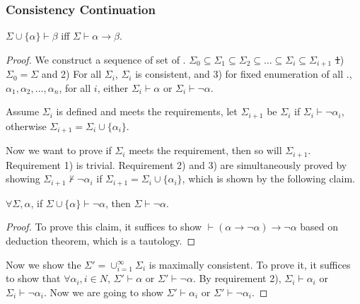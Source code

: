 \subsubsection{Consistency Continuation}

\begin{theorem}
  $\Sigma \cup \{ \alpha \} \vdash \beta$ iff $\Sigma \vdash \alpha \rightarrow \beta$.
\end{theorem}




\begin{proof}
We construct a sequence of set of \wff. $\Sigma_0 \subseteq \Sigma_1 \subseteq \Sigma_2 \subseteq \ldots \subseteq \Sigma_i \subseteq \Sigma_{i+1}$ \st 1) $\Sigma_0 = \Sigma$ and 2) For all $\Sigma_i$, $\Sigma_i$ is consistent, and 3) for fixed enumeration of all \wff., $\alpha_1, \alpha_2, \ldots, \alpha_n$, for all $i$, either $\Sigma_i \vdash \alpha$ or $\Sigma_i \vdash \neg \alpha$.

Assume $\Sigma_i$ is defined and meets the requirements, let $\Sigma_{i+1}$ be $\Sigma_i$ if $\Sigma_i \vdash \neg \alpha_{i}$, otherwise $\Sigma_{i+1} = \Sigma_i \cup \{ \alpha_i \}$. 

Now we want to prove if $\Sigma_i$ meets the requirement, then so will $\Sigma_{i+1}$.
Requirement 1) is trivial. Requirement 2) and 3) are simultaneously proved by showing $\Sigma_{i+1} \nvdash \neg \alpha_i$ if $\Sigma_{i+1} = \Sigma_i \cup \{\alpha_i\}$, which is shown by the following claim.

\begin{claim}
  $\forall \Sigma, \alpha$, if $\Sigma \cup \{ \alpha \} \vdash \neg \alpha$, then $\Sigma \vdash \neg \alpha$. 
\end{claim}
\begin{proof}
  To prove this claim, it suffices to show $\vdash (\alpha \rightarrow \neg \alpha) \rightarrow \neg \alpha$ based on deduction theorem, which is a tautology.
\end{proof}

Now we show the $\Sigma'=\cup_{i=1}^\infty \Sigma_i$ is maximally consistent.
To prove it, it suffices to show that $\forall \alpha_i, i \in N$, $\Sigma' \vdash \alpha$ or $\Sigma' \vdash \neg \alpha$.
By requirement 2), $\Sigma_i \vdash \alpha_i$ or $\Sigma_i \vdash \neg \alpha_i$. Now we are going to show $\Sigma' \vdash \alpha_i$ or $\Sigma' \vdash \neg \alpha_i$.


\end{proof}
